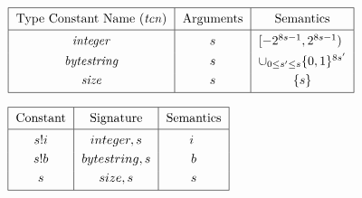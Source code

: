 \documentclass[../plutus-core-specification.tex]{subfiles}
\begin{document}
\vspace{1cm}


\begin{minipage}{\linewidth}
\centering

    \(\begin{tabular}{|c|c|c|}\hline
    \Strut
        \textrm{Type Constant Name (\textit{tcn})} & \textrm{Arguments} & \textrm{Semantics}\\
        \hline
        \textit{integer} & $s$ & $[-2^{8s-1},2^{8s-1})$ \rule{0mm}{4mm}  \\[3pt]
        \textit{bytestring} & $s$ & $\cup_{0\leq s' \leq s}\{0,1\}^{8s'}$\\[3pt]
        \textit{size} & $s$ & \{$s$\}\\[3pt]
        \hline
   \end{tabular}\)
   \label{fig:Plutus_core_type_constants}

\end{minipage}
\vspace{1cm}



\begin{minipage}{\linewidth}
\centering
   \(\begin{tabular}{|c|c|c|}\hline
    \Strut
        \textrm{Constant} & \textrm{Signature} & \textrm{Semantics}\\
        \hline
        $s!i$   & $\constsig{integer}{s}$ & $i$ \rule{0mm}{4mm} \\[3pt]
        $s!b$   & $\constsig{bytestring}{s}$ & $b$\\[3pt]
        $s$     & $\constsig{size}{s}$ & $s$\\[3pt]
        \hline
    \end{tabular}\)
    \label{fig:Plutus_core_constants}
\end{minipage}

\end{document}
